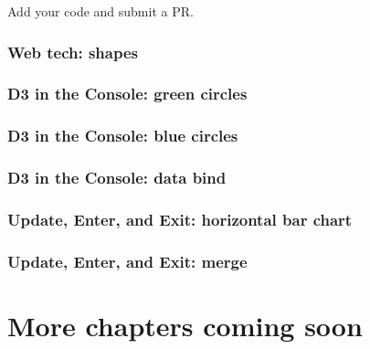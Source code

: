 \documentclass[
  openany]{book}
\begin{document}
Add your code and submit a PR.

\hypertarget{web-tech-shapes}{%
\subsection*{Web tech: shapes}\label{web-tech-shapes}}

\hypertarget{d3-in-the-console-green-circles}{%
\subsection*{D3 in the Console: green circles}\label{d3-in-the-console-green-circles}}

\hypertarget{d3-in-the-console-blue-circles}{%
\subsection*{D3 in the Console: blue circles}\label{d3-in-the-console-blue-circles}}

\hypertarget{d3-in-the-console-data-bind}{%
\subsection*{D3 in the Console: data bind}\label{d3-in-the-console-data-bind}}

\hypertarget{update-enter-and-exit-horizontal-bar-chart}{%
\subsection*{Update, Enter, and Exit: horizontal bar chart}\label{update-enter-and-exit-horizontal-bar-chart}}

\hypertarget{update-enter-and-exit-merge}{%
\subsection*{Update, Enter, and Exit: merge}\label{update-enter-and-exit-merge}}

\hypertarget{more-chapters-coming-soon}{%
\chapter{\texorpdfstring{More chapters coming soon }{More chapters coming soon }}\label{more-chapters-coming-soon}}
\end{document}
